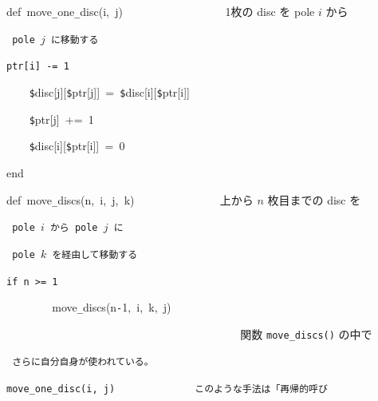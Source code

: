 \documentclass{article}
\begin{document}
\noindent
\mbox{}\tt\mc \hfill

\noindent
\mbox{}def{\tt\mc \ }move{\tt\_}one{\tt\_}disc(i,{\tt\mc \ }j){\tt\mc \ \ \ \ \ \ \ \ \ \ \ \ \ \ \ \ \ }\rm\mc {\tt\#}\  {}1枚の disc を pole $i$ から \hfill  \rm\mc 

\noindent
\mbox{}\tt\mc {\tt\mc \ \ \ \ \ \ \ \ \ \ \ \ \ \ \ \ \ \ \ \ \ \ \ \ \ \ \ \ \ \ \ \ \ \ \ \ \ \ \ \ }\rm\mc {\tt\#}\  {}pole $j$ に移動する \hfill  \rm\mc 

\noindent
\mbox{}\tt\mc {\tt\mc \ \ \ \ }{\tt\$}ptr[i]{\tt\mc \ }{\tt -}={\tt\mc \ }1

\noindent
\mbox{}{\tt\mc \ \ \ \ }{\tt\$}disc[j][{\tt\$}ptr[j]]{\tt\mc \ }={\tt\mc \ }{\tt\$}disc[i][{\tt\$}ptr[i]]

\noindent
\mbox{}{\tt\mc \ \ \ \ }{\tt\$}ptr[j]{\tt\mc \ }+={\tt\mc \ }1

\noindent
\mbox{}{\tt\mc \ \ \ \ }{\tt\$}disc[i][{\tt\$}ptr[i]]{\tt\mc \ }={\tt\mc \ }0

\noindent
\mbox{}end

\noindent
\mbox{}\hfill

\noindent
\mbox{}def{\tt\mc \ }move{\tt\_}discs(n,{\tt\mc \ }i,{\tt\mc \ }j,{\tt\mc \ }k){\tt\mc \ \ \ \ \ \ \ \ \ \ \ \ \ \ }\rm\mc {\tt\#}\  {}上から $n$ 枚目までの disc を \hfill  \rm\mc 

\noindent
\mbox{}\tt\mc {\tt\mc \ \ \ \ \ \ \ \ \ \ \ \ \ \ \ \ \ \ \ \ \ \ \ \ \ \ \ \ \ \ \ \ \ \ \ \ \ \ \ \ }\rm\mc {\tt\#}\  {}pole $i$ から pole $j$ に \hfill  \rm\mc 

\noindent
\mbox{}\tt\mc {\tt\mc \ \ \ \ \ \ \ \ \ \ \ \ \ \ \ \ \ \ \ \ \ \ \ \ \ \ \ \ \ \ \ \ \ \ \ \ \ \ \ \ }\rm\mc {\tt\#}\  {}pole $k$ を経由して移動する \hfill  \rm\mc 

\noindent
\mbox{}\tt\mc {\tt\mc \ \ \ \ }if{\tt\mc \ }n{\tt\mc \ }{\tt >}={\tt\mc \ }1

\noindent
\mbox{}{\tt\mc \ \ \ \ \ \ \ \ }move{\tt\_}discs(n{\tt -}1,{\tt\mc \ }i,{\tt\mc \ }k,{\tt\mc \ }j)

\noindent
\mbox{}{\tt\mc \ \ \ \ \ \ \ \ \ \ \ \ \ \ \ \ \ \ \ \ \ \ \ \ \ \ \ \ \ \ \ \ \ \ \ \ \ \ \ \ }\rm\mc {\tt\#}\  {}関数 {\tt move\_discs()} の中で \hfill  \rm\mc 

\noindent
\mbox{}\tt\mc {\tt\mc \ \ \ \ \ \ \ \ \ \ \ \ \ \ \ \ \ \ \ \ \ \ \ \ \ \ \ \ \ \ \ \ \ \ \ \ \ \ \ \ }\rm\mc {\tt\#}\  {}さらに自分自身が使われている。 \hfill  \rm\mc 

\noindent
\mbox{}\tt\mc {\tt\mc \ \ \ \ \ \ \ \ }move{\tt\_}one{\tt\_}disc(i,{\tt\mc \ }j){\tt\mc \ \ \ \ \ \ \ \ \ \ \ \ \ }\rm\mc {\tt\#}\  {}このような手法は「再帰的呼び \hfill  \rm\mc 
\end{document}

